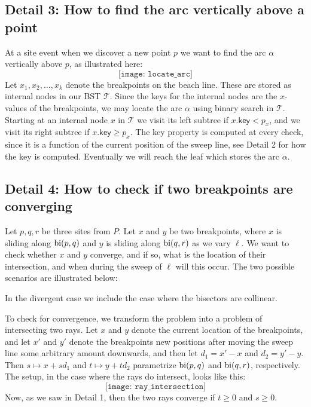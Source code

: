\subsection*{Detail 3: How to find the arc vertically above a point}
At a site event when we discover a new point $p$ we want to find the arc $\alpha$ vertically above $p$, as illustrated here:
\[
    \texttt{[image: locate\_arc]}
\]
Let $x_1, x_2, \ldots, x_k$ denote the breakpoints on the beach line. These are stored as internal nodes in our BST $\mathcal{T}$. Since the keys for the internal nodes are the $x$-values of the breakpoints, we may locate the arc $\alpha$ using binary search in $\mathcal{T}$. Starting at an internal node $x$ in $\mathcal{T}$ we visit its left subtree if $x\textsf{.key} < p_x$, and we visit its right subtree if $x\textsf{.key} \geq p_x$. The key property is computed at every check, since it is a function of the current position of the sweep line, see Detail 2 for how the key is computed. Eventually we will reach the leaf which stores the arc $\alpha$.

\subsection*{Detail 4: How to check if two breakpoints are converging}
Let $p, q, r$ be three sites from $P$. Let $x$ and $y$ be two breakpoints, where $x$ is sliding along $\operatorname{bi}(p, q)$ and $y$ is sliding along $\operatorname{bi}(q, r)$ as we vary $\ell$. We want to check whether $x$ and $y$ converge, and if so, what is the location of their intersection, and when during the sweep of $\ell$ will this occur. The two possible scenarios are illustrated below:
\begin{figure}[H]
    \centering
\end{figure}
In the divergent case we include the case where the bisectors are collinear. 

To check for convergence, we transform the problem into a problem of intersecting two rays. Let $x$ and $y$ denote the current location of the breakpoints, and let $x'$ and $y'$ denote the breakpoints new positions after moving the sweep line some arbitrary amount downwards, and then let $d_1 = x' - x$ and $d_2 = y' - y$. Then $s \mapsto x + s d_1$ and $t \mapsto y + t d_2$ parametrize $\operatorname{bi}(p, q)$ and $\operatorname{bi}(q, r)$, respectively. The setup, in the case where the rays do intersect, looks like this:
\[
    \texttt{[image: ray\_intersection]}
\]
Now, as we saw in Detail 1, then the two rays converge if $t \geq 0$ and $s \geq 0$.

